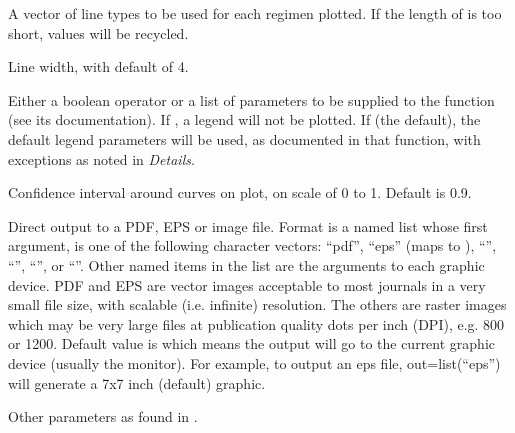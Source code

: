 \documentclass[a4paper]{book}
\begin{document}
\begin{Arguments}
\begin{ldescription}
\item[\code{lty}] A vector of line types to be used for each regimen plotted.  If the
length of  is too short, values will be recycled.

\item[\code{lwd}] Line width, with default of 4.

\item[\code{legend}] Either a boolean operator or a list of parameters to be supplied to the 
function (see its documentation).  If , a legend will not be plotted.
If  (the default), the default legend parameters will be used, as documented in that function, with exceptions
as noted in \emph{Details}.

\item[\code{ci}] Confidence interval around curves on  plot, on scale of 0 to 1. Default is 0.9.

\item[\code{out}] Direct output to a PDF, EPS or image file.  Format is a named list whose first argument, 
 is one of the following character vectors: ``pdf'', ``eps'' (maps to ),
``'', ``'', ``'', or ``''.  Other named items in the list
are the arguments to each graphic device. PDF and EPS are vector images acceptable to most journals
in a very small file size, with scalable (i.e. infinite) resolution.  The others are raster images which may be very
large files at publication quality dots per inch (DPI), e.g. 800 or 1200. Default value is  which means the 
output will go to the current graphic device (usually the monitor). For example, to output an eps file,
out=list(``eps'') will generate a 7x7 inch (default) graphic.

\item[\code{...}] Other parameters as found in .
\end{ldescription}
\end{Arguments}
%
\end{document}
